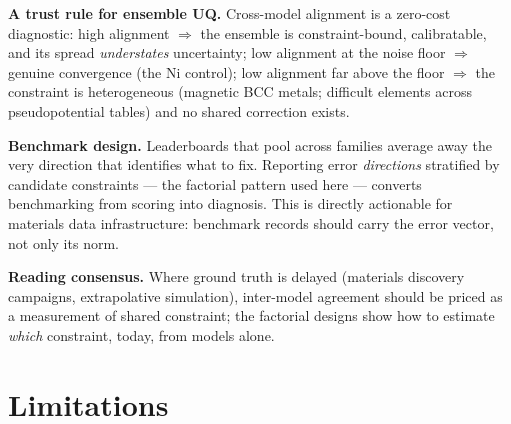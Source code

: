 \documentclass[11pt]{article}
\theoremstyle{remark}
\begin{document}
\textbf{A trust rule for ensemble UQ.} Cross-model alignment is a zero-cost
diagnostic: high alignment $\Rightarrow$ the ensemble is constraint-bound,
calibratable, and its spread \emph{understates} uncertainty; low alignment at
the noise floor $\Rightarrow$ genuine convergence (the Ni control); low
alignment far above the floor $\Rightarrow$ the constraint is heterogeneous
(magnetic BCC metals; difficult elements across pseudopotential tables) and no
shared correction exists.

\textbf{Benchmark design.} Leaderboards that pool across families average away
the very direction that identifies what to fix. Reporting error
\emph{directions} stratified by candidate constraints --- the factorial
pattern used here --- converts benchmarking from scoring into diagnosis. This
is directly actionable for materials data infrastructure: benchmark records
should carry the error vector, not only its norm.

\textbf{Reading consensus.} Where ground truth is delayed (materials
discovery campaigns, extrapolative simulation), inter-model agreement should
be priced as a measurement of shared constraint; the factorial designs show
how to estimate \emph{which} constraint, today, from models alone.

\section{Limitations}
\label{sec:limits}
\end{document}
